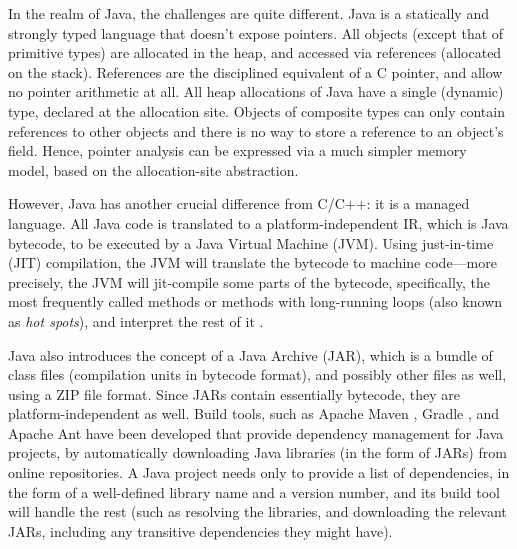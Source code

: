 In the realm of Java, the challenges are quite different. Java is a
statically and strongly typed language that doesn't expose
pointers. All objects (except that of primitive types) are allocated
in the heap, and accessed via references (allocated on the
stack). References are the disciplined equivalent of a C pointer, and
allow no pointer arithmetic at all. All heap allocations of Java have
a single (dynamic) type, declared at the allocation site. Objects of
composite types can only contain references to other objects and there
is no way to store a reference to an object's field. Hence, pointer
analysis can be expressed via a much simpler memory model, based on the
allocation-site abstraction.

However, Java has another crucial difference from C/C++: it is a
managed language. All Java code is translated to a
platform-independent IR, which is Java bytecode, to be executed by a
Java Virtual Machine (JVM). Using just-in-time (JIT) compilation, the
JVM will translate the bytecode to machine code---more precisely, the
JVM will jit-compile some parts of the bytecode, specifically, the
most frequently called methods or methods with long-running loops
(also known as \emph{hot spots}), and interpret the rest of it
\cite{journals/taco/KotzmannWMRRC08}.

Java also introduces the concept of a Java Archive (JAR), which is a
bundle of class files (compilation units in bytecode format), and
possibly other files as well, using a ZIP file format. Since JARs
contain essentially bytecode, they are platform-independent as
well. Build tools, such as Apache Maven \cite{www:maven}, Gradle
\cite{www:gradle}, and Apache Ant \cite{www:ant} have been developed
that provide dependency management for Java projects, by automatically
downloading Java libraries (in the form of JARs) from online
repositories. A Java project needs only to provide a list of
dependencies, in the form of a well-defined library name and a version
number, and its build tool will handle the rest (such as resolving the
libraries, and downloading the relevant JARs, including any transitive
dependencies they might have).

